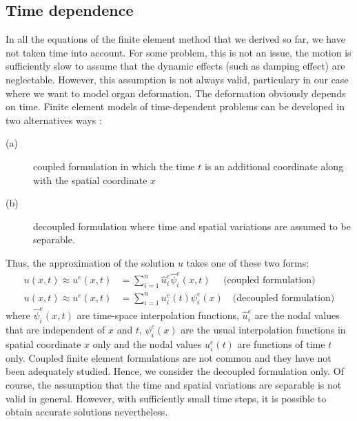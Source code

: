 	\subsection{Time dependence}
In all the equations of the finite element method that we derived so far, we have not taken time into account. For some problem, this is not an issue, the motion is sufficiently slow to assume that the dynamic effects (such as damping effect) are neglectable. However, this assumption is not always valid, particulary in our case where we want to model organ deformation. The deformation obviously depends on time. Finite element models of time-dependent problems can be developed in two alternatives ways \citep{Reddy93}:
\begin{description}
\item[(a)] coupled formulation in which the time $ t $ is an additional coordinate along with the spatial coordinate $ x $
\item[(b)] decoupled formulation where time and spatial variations are assumed to be separable.
\end{description}
Thus, the approximation of the solution $ u $ takes one of these two forms:
\begin{align}
u(x, t) \approx u^e(x, t) &= \sum_{i=1}^n \hat{u}^e_i \hat{\psi}^e_i(x, t)  \quad \text{ (coupled formulation)} \label{chap3:approxTime1}\\
u(x, t) \approx u^e(x, t) &= \sum_{i=1}^n u^e_i(t) \psi^e_i(x) \quad \text{(decoupled formulation)} \label{chap3:approxTime2}
\end{align}
where $ \hat{\psi}^e_i(x, t) $ are time-space interpolation functions, $ \hat{u}^e_i $ are the nodal values that are independent of $ x $ and $ t $, $ \psi^e_i(x) $ are the usual interpolation functions in spatial coordinate $ x $ only and the nodal values $ u^e_i(t) $ are functions of time $ t $ only. Coupled finite element formulations are not common and they have not been adequately studied. Hence, we consider the decoupled formulation only. Of course, the assumption that the time and spatial variations are separable is not valid in general. However, with sufficiently small time steps, it is possible to obtain accurate solutions nevertheless. 

	

